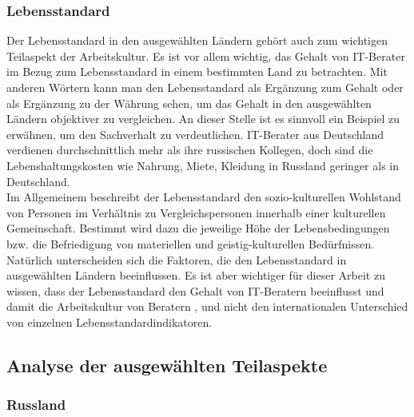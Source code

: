 \subsubsection{Lebensstandard}
Der Lebensstandard in den ausgewählten Ländern gehört auch zum wichtigen Teilaspekt der Arbeitskultur. Es ist vor allem wichtig, das Gehalt von IT-Berater im Bezug zum Lebensstandard in einem bestimmten Land zu betrachten. Mit anderen Wörtern kann man den Lebensstandard als Ergänzung zum Gehalt oder als Ergänzung zu der Währung sehen, um das Gehalt in den ausgewählten Ländern objektiver zu vergleichen. An dieser Stelle ist es sinnvoll ein Beispiel zu erwähnen, um den Sachverhalt zu verdeutlichen. IT-Berater aus Deutschland verdienen durchschnittlich mehr als ihre russischen Kollegen, doch sind die Lebenshaltungskosten wie Nahrung, Miete, Kleidung in Russland geringer als in Deutschland.\\
Im Allgemeinem beschreibt der Lebensstandard den sozio-kulturellen Wohlstand von Personen im Verhältnis zu Vergleichspersonen innerhalb einer kulturellen Gemeinschaft. Bestimmt wird dazu die jeweilige Höhe der Lebensbedingungen bzw. die Befriedigung von materiellen und geistig-kulturellen Bedürfnissen. \cite{LbsWiki} \\
Natürlich unterscheiden sich die Faktoren, die den Lebensstandard in ausgewählten Ländern beeinflussen. Es ist aber wichtiger für dieser Arbeit zu wissen, dass der Lebensstandard den Gehalt von IT-Beratern beeinflusst und damit die Arbeitskultur von Beratern , und nicht den internationalen Unterschied von einzelnen Lebensstandardindikatoren.

\subsection{Analyse der ausgewählten Teilaspekte}

	\subsubsection{Russland}

